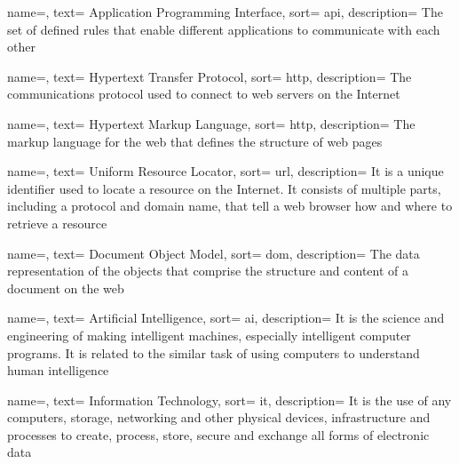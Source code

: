 {
  name=,
  text= Application Programming Interface,
  sort= api,
  description= {The set of defined rules that enable different applications to communicate with each other}
}

{
  name=,
  text= Hypertext Transfer Protocol,
  sort= http,
  description= {The communications protocol used to connect to web servers on the Internet}
}

{
  name=,
  text= Hypertext Markup Language,
  sort= http,
  description= {The markup language for the web that defines the structure of web pages}
}

{
  name=,
  text= Uniform Resource Locator,
  sort= url,
  description= {It is a unique identifier used to locate a resource on the Internet. It consists of multiple parts, including a protocol and domain name, that tell a web browser how and where to retrieve a resource}
}

{
  name=,
  text= Document Object Model,
  sort= dom,
  description= {The data representation of the objects that comprise the structure and content of a document on the web}
}

{
  name=,
  text= Artificial Intelligence,
  sort= ai,
  description= {It is the science and engineering of making intelligent machines, especially intelligent computer programs. It is related to the similar task of using computers to understand human intelligence}
}

{
  name=,
  text= Information Technology,
  sort= it,
  description= {It is the use of any computers, storage, networking and other physical devices, infrastructure and processes to create, process, store, secure and exchange all forms of electronic data}
}

